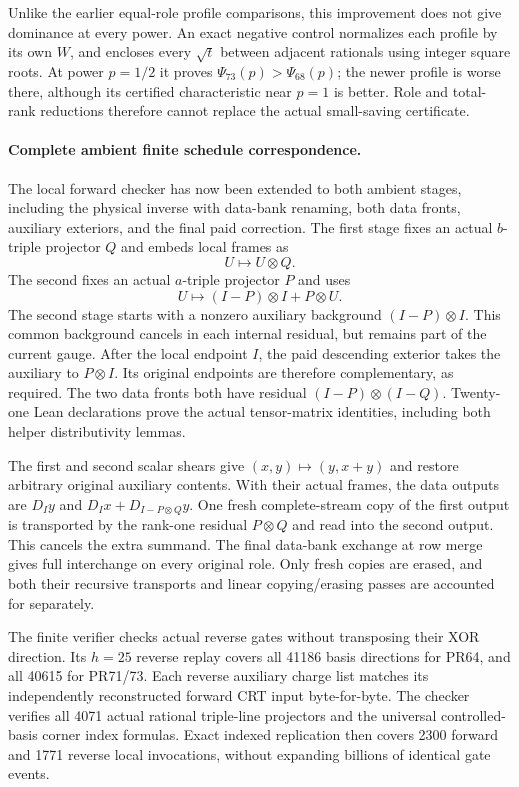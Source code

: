 \documentclass[11pt]{article}
\begin{document}
Unlike the earlier equal-role profile comparisons, this improvement does
not give dominance at every power. An exact negative control normalizes
each profile by its own $W$, and encloses every $\sqrt t$ between adjacent
rationals using integer square roots. At power $p=1/2$ it proves
$\Psi_{73}(p)>\Psi_{68}(p)$; the newer profile is worse there, although
its certified characteristic near $p=1$ is better. Role and total-rank
reductions therefore cannot replace the actual small-saving certificate.

\paragraph{Complete ambient finite schedule correspondence.}
The local forward checker has now been extended to both ambient stages,
including the physical inverse with data-bank renaming, both data fronts,
auxiliary exteriors, and the final paid correction. The first stage fixes
an actual $b$-triple projector $Q$ and embeds local frames as
\[
 U\longmapsto U\otimes Q.
\]
The second fixes an actual $a$-triple projector $P$ and uses
\[
 U\longmapsto (I-P)\otimes I+P\otimes U.
\]
The second stage starts with a nonzero auxiliary background
$(I-P)\otimes I$. This common background cancels in each internal
residual, but remains part of the current gauge. After the local endpoint
$I$, the paid descending exterior takes the auxiliary to $P\otimes I$.
Its original endpoints are therefore complementary, as required.
The two data fronts both have residual $(I-P)\otimes(I-Q)$.
Twenty-one Lean declarations prove the actual tensor-matrix identities,
including both helper distributivity lemmas.

The first and second scalar shears give $(x,y)\mapsto(y,x+y)$ and
restore arbitrary original auxiliary contents. With their actual frames,
the data outputs are $D_Iy$ and $D_Ix+D_{I-P\otimes Q}y$.
One fresh complete-stream copy of the first output is transported by
the rank-one residual $P\otimes Q$ and read into the second output.
This cancels the extra summand. The final data-bank exchange at row
merge gives full interchange on every original role. Only fresh copies
are erased, and both their recursive transports and linear copying/erasing
passes are accounted for separately.

The finite verifier checks actual reverse gates without transposing their
XOR direction. Its $h=25$ reverse replay covers all 41186 basis directions
for PR64, and all 40615 for PR71/73. Each reverse auxiliary charge list
matches its independently reconstructed forward CRT input byte-for-byte.
The checker verifies all 4071 actual rational triple-line projectors and
the universal controlled-basis corner index formulas. Exact indexed
replication then covers 2300 forward and 1771 reverse local invocations,
without expanding billions of identical gate events.
\end{document}

